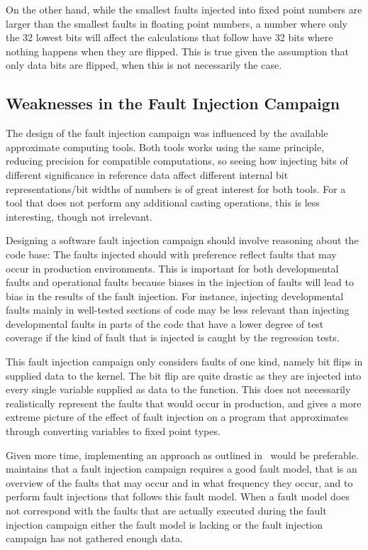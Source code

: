 On the other hand, while the smallest faults injected into fixed point numbers are larger than the smallest faults in floating point numbers, a number where only the 32 lowest bits will affect the calculations that follow have 32 bits where nothing happens when they are flipped. This is true given the assumption that only data bits are flipped, when this is not necessarily the case.

\subsection{Weaknesses in the Fault Injection Campaign}

The design of the fault injection campaign was influenced by the available approximate computing tools. Both tools works using the same principle, reducing precision for compatible computations, so seeing how injecting bits of different significance in reference data affect different internal bit representations/bit widths of numbers is of great interest for both tools. For a tool that does not perform any additional casting operations, this is less interesting, though not irrelevant. 

Designing a software fault injection campaign should involve reasoning about the code base: The faults injected should with preference reflect faults that may occur in production environments. This is important for both developmental faults and operational faults because biases in the injection of faults will lead to bias in the results of the fault injection. For instance, injecting developmental faults mainly in  well-tested sections of code may be less relevant than injecting developmental faults in parts of the code that have a lower degree of test coverage if the kind of fault that is injected is caught by the regression tests. 

This fault injection campaign only considers faults of one kind, namely bit flips in supplied data to the kernel. The bit flip are quite drastic as they are injected into every single variable supplied as data to the function. This does not necessarily realistically represent the faults that would occur in production, and gives a more extreme picture of the effect of fault injection on a program that approximates through converting variables to fixed point types. 

Given more time, implementing an approach as outlined in~\citep{van2016finding} would be preferable. \citep{van2016finding} maintains that a fault injection campaign requires a good fault model, that is an overview of the faults that may occur and in what frequency they occur, and to perform fault injections that follows this fault model. When a fault model does not correspond with the faults that are actually executed during the fault injection campaign either the fault model is lacking or the fault injection campaign has not gathered enough data. 

